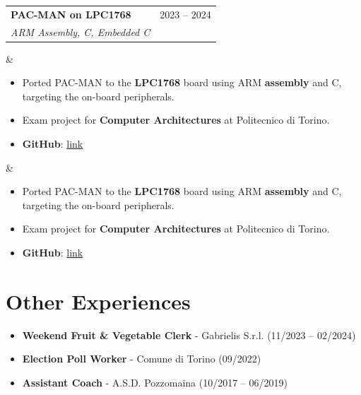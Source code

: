 \documentclass[10pt,a4paper]{article}
\makeatletter
\newcommand{\entry}[4]{%
  \noindent\begin{tabularx}{\linewidth}{@{}X r@{}}
    \textbf{#1} & #3 \\
    \textit{#2} & \\
  \end{tabularx}\vspace{-4pt}
  \ifx&#4&\else\par#4\fi
}
\makeatother
\begin{document}
\entry{PAC-MAN on LPC1768}{ARM Assembly, C, Embedded C}{2023 -- 2024}{%
\begin{itemize}
  \item Ported PAC-MAN to the \textbf{LPC1768} board using ARM \textbf{assembly} and C,
        targeting the on-board peripherals.
  \item Exam project for \textbf{Computer Architectures} at Politecnico di Torino.
  \item \textbf{GitHub}: \href{https://github.com/Koisuji02/PAC-MAN}{link}
\end{itemize}}

\section*{Other Experiences}

\begin{itemize}
  \item \textbf{Weekend Fruit \& Vegetable Clerk} - Gabrielis S.r.l. (11/2023 -- 02/2024)
  \item \textbf{Election Poll Worker} - Comune di Torino (09/2022)
  \item \textbf{Assistant Coach} - A.S.D. Pozzomaina (10/2017 -- 06/2019)
\end{itemize}
\end{document}
